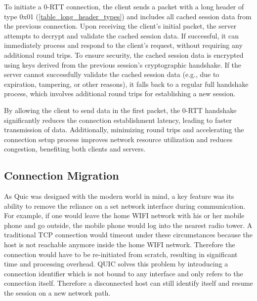 To initiate a 0-RTT connection, the client sends a packet with a long header of type 0x01 (\ref{table_long_header_types}) and includes all cached session data from the previous connection. Upon receiving the client's initial packet, the server attempts to decrypt and validate the cached session data. If successful, it can immediately process and respond to the client's request, without requiring any additional round trips. To ensure security, the cached session data is encrypted using keys derived from the previous session's cryptographic handshake. If the server cannot successfully validate the cached session data (e.g., due to expiration, tampering, or other reasons), it falls back to a regular full handshake process, which involves additional round trips for establishing a new session.


By allowing the client to send data in the first packet, the 0-RTT handshake significantly reduces the connection establishment latency, leading to faster transmission of data. Additionally, minimizing round trips and accelerating the connection setup process improves network resource utilization and reduces congestion, benefiting both clients and servers.


\subsection{Connection Migration} \label{connection_migration}

As Quic was designed with the modern world in mind, a key feature was its ability to remove the reliance on a set network interface during communication. For example, if one would leave the home WIFI network with his or her mobile phone and go outside, the mobile phone would log into the nearest radio tower. A traditional TCP connection would timeout under these circumstances because the host is not reachable anymore inside the home WIFI network. Therefore the connection would have to be re-initiated from scratch, resulting in significant time and processing overhead. QUIC solves this problem by introducing a connection identifier which is not bound to any interface and only refers to the connection itself. Therefore a disconnected host can still identify itself and resume the session on a new network path.

